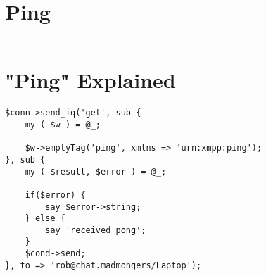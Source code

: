 \section{Ping}

\pause

\begin{shaded}
\inputminted{perl}{examples/ping.pl}
\end{shaded}

\newpage

\section{"Ping" Explained}

\pause

\begin{shaded}
\begin{verbatim}
$conn->send_iq('get', sub {
    my ( $w ) = @_;

    $w->emptyTag('ping', xmlns => 'urn:xmpp:ping');
}, sub {
    my ( $result, $error ) = @_;

    if($error) {
        say $error->string;
    } else {
        say 'received pong';
    }
    $cond->send;
}, to => 'rob@chat.madmongers/Laptop');
\end{verbatim}
\end{shaded}
